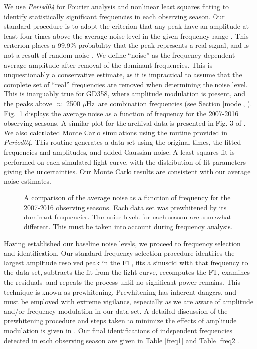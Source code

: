 \documentclass[12pt,preprint]{aastex}
\begin{document}
We use {\sl Period04} \citep{Lenz05} for Fourier analysis and nonlinear least squares fitting to 
identify statistically significant frequencies in each observing season. Our standard procedure is to adopt the criterion 
that any peak have an amplitude at least four times above the average noise level in the given frequency range 
\citep{Provencal12}. This criterion places a 99.9\% probability that the peak represents a real signal,
and is not a result of random noise \citep{Scargle82, Provencal12}.  We define ``noise'' as the frequency-dependent 
average amplitude after removal of the dominant frequencies. This is unquestionably a conservative estimate, 
as it is impractical to assume that the complete set of ``real'' frequencies are removed when determining
the noise level. This is inarguably true for GD358, where amplitude modulation is present, and the peaks above $\approx$ 2500 $\mu$Hz\ 
are combination frequencies (see Section \ref{mode}, \citet{Provencal09}).  Fig.~\ref{noise} displays the average noise 
as a function of frequency for the 2007-2016 observing seasons. A similar plot for the 
archival data is presented in Fig. 3 of \citet{Provencal09}. We also calculated Monte Carlo 
simulations using the routine provided in {\sl Period04}.  This routine generates a data set using 
the original times, the fitted frequencies and amplitudes, and added Gaussian noise. A least squares fit is 
performed on each simulated light curve, with the distribution of fit parameters giving the uncertainties. 
Our Monte Carlo results are consistent with our average noise estimates.

\begin{figure}
\caption{A comparison of the average noise as a function of frequency for the 2007-2016 observing 
seasons.  Each data set was prewhitened by its dominant frequencies.  The noise levels for each 
season are somewhat different.  This must be taken into account during frequency analysis.  
\label{noise}
}
\end{figure}

Having established our baseline noise levels, we proceed to frequency selection and identification.
Our standard frequency selection procedure identifies the largest amplitude resolved peak in the FT,
fits a sinusoid with that frequency to the data set, subtracts the fit from the light curve, 
recomputes the FT, examines the residuals, and repeats the process until no significant power 
remains. This technique is known as prewhitening. Prewhitening has inherent dangers, and must be 
employed with extreme vigilance, especially as we are aware of amplitude and/or frequency 
modulation in our data set. A detailed discussion of the prewhitening procedure and steps 
taken to minimize the effects of amplitude modulation is given in \citet{Provencal09}. Our final 
identifications of independent frequencies detected in each observing season are given in 
Table \ref{freq1} and Table \ref{freq2}.
\end{document}
